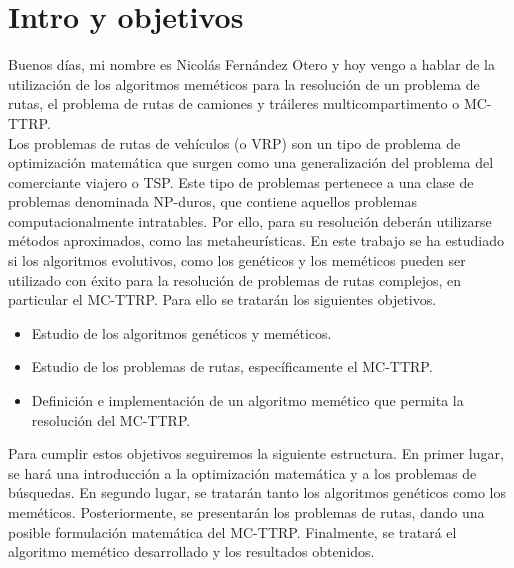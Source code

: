 \documentclass[a4paper]{article}
\begin{document}
\section{Intro y objetivos}
Buenos días, mi nombre es Nicolás Fernández Otero y hoy vengo a hablar de la utilización de los algoritmos meméticos para la resolución de un problema de rutas, el problema de rutas de camiones y tráileres multicompartimento o MC-TTRP.\\

Los problemas de rutas de vehículos (o VRP) son un tipo de problema de optimización matemática que surgen como una generalización del problema del comerciante viajero o TSP. Este tipo de problemas pertenece a una clase de problemas denominada NP-duros, que contiene aquellos problemas computacionalmente intratables. Por ello, para su resolución deberán utilizarse métodos aproximados, como las metaheurísticas. En este trabajo se ha estudiado si los algoritmos evolutivos, como los genéticos y los meméticos pueden ser utilizado con éxito para la resolución de problemas de rutas complejos, en particular el MC-TTRP. Para ello se tratarán los siguientes objetivos.

\begin{itemize}
    \item Estudio de los algoritmos genéticos y meméticos.
    \item Estudio de los problemas de rutas, específicamente el MC-TTRP.
    \item Definición e implementación de un algoritmo memético que permita la resolución del MC-TTRP.
\end{itemize}

Para cumplir estos objetivos seguiremos la siguiente estructura. En primer lugar, se hará una introducción a la optimización matemática y a los problemas de búsquedas. En segundo lugar, se tratarán tanto los algoritmos genéticos como los meméticos. Posteriormente, se presentarán los problemas de rutas, dando una posible formulación matemática del MC-TTRP. Finalmente, se tratará el algoritmo memético desarrollado y los resultados obtenidos.
\end{document}
